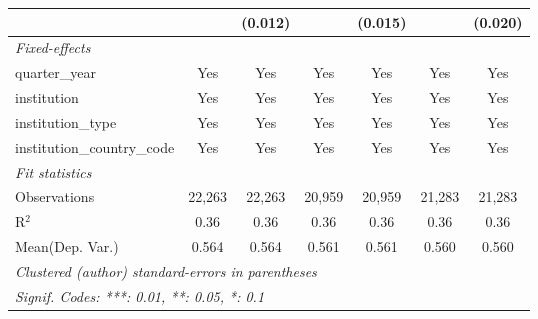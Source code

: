 \begin{tabular}{lcccccc}
                                      &               & (0.012)       &               & (0.015)       &               & (0.020)\\   
   \midrule
   \emph{Fixed-effects}\\
   quarter\_year                      & Yes           & Yes           & Yes           & Yes           & Yes           & Yes\\  
   institution                        & Yes           & Yes           & Yes           & Yes           & Yes           & Yes\\  
   institution\_type                  & Yes           & Yes           & Yes           & Yes           & Yes           & Yes\\  
   institution\_country\_code         & Yes           & Yes           & Yes           & Yes           & Yes           & Yes\\  
   \midrule
   \emph{Fit statistics}\\
   Observations                       & 22,263        & 22,263        & 20,959        & 20,959        & 21,283        & 21,283\\  
   R$^2$                              & 0.36          & 0.36          & 0.36          & 0.36          & 0.36          & 0.36\\  
Mean(Dep. Var.) & 0.564 & 0.564 & 0.561 & 0.561 & 0.560 & 0.560 \\
   \midrule \midrule
   \multicolumn{7}{l}{\emph{Clustered (author) standard-errors in parentheses}}\\
   \multicolumn{7}{l}{\emph{Signif. Codes: ***: 0.01, **: 0.05, *: 0.1}}\\
\end{tabular}
\par\endgroup
